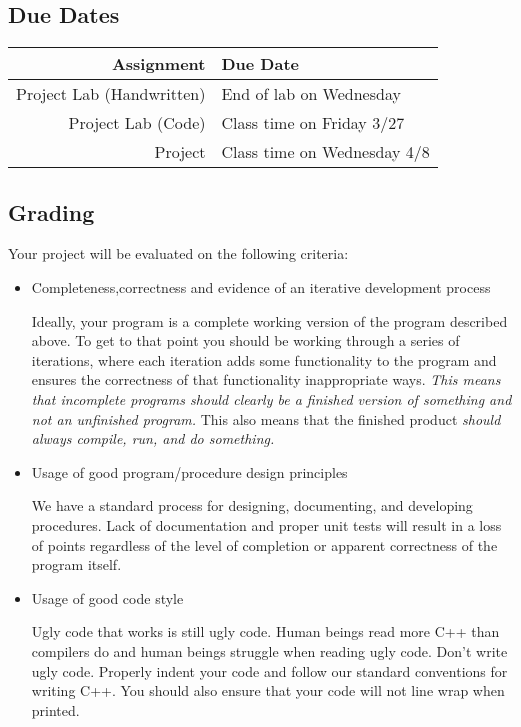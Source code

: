 \documentclass[]{tufte-handout}
\begin{document}
\subsection{Due Dates}

\begin{center}
\begin{tabular}{rl}
Assignment & Due Date \\ \hline
Project Lab (Handwritten) & End of lab on Wednesday \\
Project Lab (Code) & Class time on Friday 3/27 \\
Project & Class time on Wednesday 4/8
\end{tabular}
\end{center}


\subsection{Grading}

Your project will be evaluated on the following criteria:
\begin{itemize}
\item Completeness,correctness and evidence of an iterative development process

Ideally, your program is a complete working version of the program described above. To get to that point you should be working through a series of iterations, where each iteration adds some functionality to the program and ensures the correctness of that functionality inappropriate ways.  \textit{This means that incomplete programs should clearly be a finished version of something and not an unfinished program.} This also means that the finished product \textit{should always compile, run, and do something.} 

\item Usage of good program/procedure design principles

We have a standard process for designing, documenting, and developing procedures. Lack of documentation and proper unit tests will result in a loss of points regardless of the level of completion or apparent correctness of the program itself.

\item Usage of good code style

Ugly code that works is still ugly code. Human beings read more C++ than compilers do and human beings struggle when reading ugly code. Don't write ugly code.  Properly indent your code and follow our standard conventions for writing C++.  You should also ensure that your code will not line wrap when printed.
\end{itemize}
\end{document}
